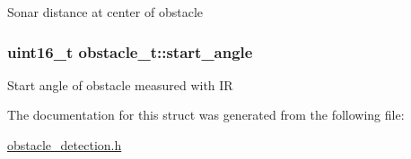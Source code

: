 Sonar distance at center of obstacle \hypertarget{structobstacle__t_a056f428b29898fdb253738735fd8169c}{
\subsubsection[{start\+\_\+angle}]{\setlength{\rightskip}{0pt plus 5cm}uint16\+\_\+t obstacle\+\_\+t\+::start\+\_\+angle}}\label{structobstacle__t_a056f428b29898fdb253738735fd8169c}
Start angle of obstacle measured with I\+R 

The documentation for this struct was generated from the following file\+:\begin{DoxyCompactItemize}
\item 
\hyperlink{obstacle__detection_8h}{obstacle\+\_\+detection.\+h}\end{DoxyCompactItemize}
